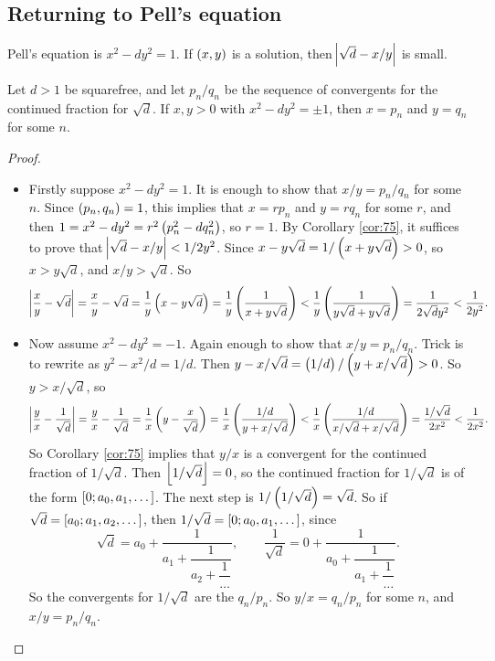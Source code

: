\subsection{Returning to Pell's equation}


Pell's equation is $ x^2 - dy^2 = 1 $. If $ \br{x, y} $ is a solution, then $ \abs{\sqrt{d} - x / y} $ is small.

\begin{proposition}
Let $ d > 1 $ be squarefree, and let $ p_n / q_n $ be the sequence of convergents for the continued fraction for $ \sqrt{d} $. If $ x, y > 0 $ with $ x^2 - dy^2 = \pm 1 $, then $ x = p_n $ and $ y = q_n $ for some $ n $.
\end{proposition}

\begin{proof}
\hfill
\begin{itemize}
\item Firstly suppose $ x^2 - dy^2 = 1 $. It is enough to show that $ x / y = p_n / q_n $ for some $ n $. Since $ \br{p_n, q_n} = 1 $, this implies that $ x = rp_n $ and $ y = rq_n $ for some $ r $, and then $ 1 = x^2 - dy^2 = r^2\br{p_n^2 - dq_n^2} $, so $ r = 1 $. By Corollary \ref{cor:75}, it suffices to prove that $ \abs{\sqrt{d} - x / y} < 1 / 2y^2 $. Since $ x - y\sqrt{d} = 1 / \br{x + y\sqrt{d}} > 0 $, so $ x > y\sqrt{d} $, and $ x / y > \sqrt{d} $. So
$$ \abs{\dfrac{x}{y} - \sqrt{d}} = \dfrac{x}{y} - \sqrt{d} = \dfrac{1}{y}\br{x - y\sqrt{d}} = \dfrac{1}{y}\br{\dfrac{1}{x + y\sqrt{d}}} < \dfrac{1}{y}\br{\dfrac{1}{y\sqrt{d} + y\sqrt{d}}} = \dfrac{1}{2\sqrt{d}y^2} < \dfrac{1}{2y^2}. $$

\pagebreak

\item Now assume $ x^2 - dy^2 = -1 $. Again enough to show that $ x / y = p_n / q_n $. Trick is to rewrite as $ y^2 - x^2 / d = 1 / d $. Then $ y - x / \sqrt{d} = \br{1 / d} / \br{y + x / \sqrt{d}} > 0 $. So $ y > x / \sqrt{d} $, so
$$ \abs{\dfrac{y}{x} - \dfrac{1}{\sqrt{d}}} = \dfrac{y}{x} - \dfrac{1}{\sqrt{d}} = \dfrac{1}{x}\br{y - \dfrac{x}{\sqrt{d}}} = \dfrac{1}{x}\br{\dfrac{1 / d}{y + x / \sqrt{d}}} < \dfrac{1}{x}\br{\dfrac{1 / d}{x / \sqrt{d} + x / \sqrt{d}}} = \dfrac{1 / \sqrt{d}}{2x^2} < \dfrac{1}{2x^2}. $$
So Corollary \ref{cor:75} implies that $ y / x $ is a convergent for the continued fraction of $ 1 / \sqrt{d} $. Then $ \left\lfloor 1 / \sqrt{d} \right\rfloor = 0 $, so the continued fraction for $ 1 / \sqrt{d} $ is of the form $ \sbr{0; a_0, a_1, \dots} $. The next step is $ 1 / \br{1 / \sqrt{d}} = \sqrt{d} $. So if $ \sqrt{d} = \sbr{a_0; a_1, a_2, \dots} $, then $ 1 / \sqrt{d} = \sbr{0; a_0, a_1, \dots} $, since
$$ \sqrt{d} = a_0 + \dfrac{1}{a_1 + \dfrac{1}{a_2 + \dfrac{1}{\dots}}}, \qquad \dfrac{1}{\sqrt{d}} = 0 + \dfrac{1}{a_0 + \dfrac{1}{a_1 + \dfrac{1}{\dots}}}. $$
So the convergents for $ 1 / \sqrt{d} $ are the $ q_n / p_n $. So $ y / x = q_n / p_n $ for some $ n $, and $ x / y = p_n / q_n $.
\end{itemize}
\end{proof}

